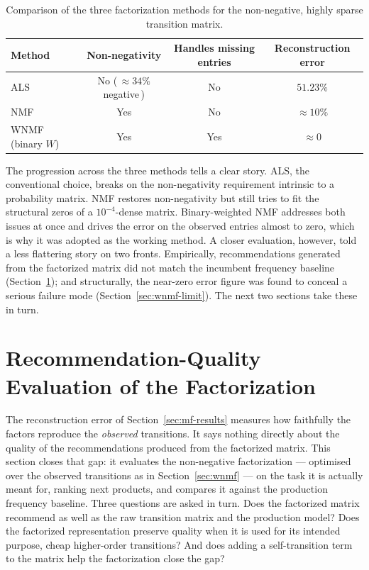 \begin{table}[ht]
  \centering
  \caption{Comparison of the three factorization methods for the non-negative,
           highly sparse transition matrix.}
  \label{tab:mf-comparison}
  \begin{tabular}{lccc}
    \toprule
    Method & Non-negativity & Handles missing entries & Reconstruction error \\
    \midrule
    ALS              & No (\,$\approx34\%$ negative\,) & No   & $51.23\%$ \\
    NMF              & Yes                              & No   & $\approx 10\%$ \\
    WNMF (binary $W$) & Yes                             & Yes  & $\approx 0$ \\
    \bottomrule
  \end{tabular}
\end{table}

\noindent The progression across the three methods tells a clear story. ALS,
the conventional choice, breaks on the non-negativity requirement intrinsic to
a probability matrix. NMF restores non-negativity but still tries to fit the
structural zeros of a $10^{-4}$-dense matrix. Binary-weighted NMF addresses
both issues at once and drives the error on the observed entries almost to
zero, which is why it was adopted as the working method. A closer evaluation,
however, told a less flattering story on two fronts. Empirically, recommendations generated from
the factorized matrix did not match the incumbent frequency baseline
(Section~\ref{sec:mf-ctr}); and structurally, the near-zero error figure was
found to conceal a serious failure mode (Section~\ref{sec:wnmf-limit}). The next
two sections take these in turn.

\section{Recommendation-Quality Evaluation of the Factorization}
\label{sec:mf-ctr}

The reconstruction error of Section~\ref{sec:mf-results} measures how faithfully
the factors reproduce the \emph{observed} transitions. It says nothing directly
about the quality of the recommendations produced from the factorized matrix.
This section closes that gap: it evaluates the non-negative factorization ---
optimised over the observed transitions as in Section~\ref{sec:wnmf} --- on the
task it is actually meant for, ranking next products, and compares it against the
production frequency baseline. Three questions are asked in turn. Does the
factorized matrix recommend as well as the raw transition matrix and the
production model? Does the factorized representation preserve quality when it is
used for its intended purpose, cheap higher-order transitions? And does adding a
self-transition term to the matrix help the factorization close the gap?

